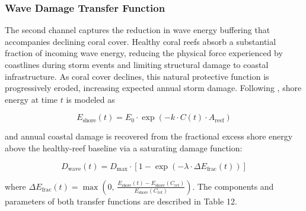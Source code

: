 \documentclass[10pt,letterpaper]{article}
\begin{document}
\subsubsection{Wave Damage Transfer Function}

The second channel captures the reduction in wave energy buffering that accompanies declining coral cover. Healthy coral reefs absorb a substantial fraction of incoming wave energy, reducing the physical force experienced by coastlines during storm events and limiting structural damage to coastal infrastructure. As coral cover declines, this natural protective function is progressively eroded, increasing expected annual storm damage. Following \cite{ferrario_2014, storlazzi_2019}, shore energy at time $t$ is modeled as

\begin{equation}
E_{\text{shore}}(t) = E_0 \cdot \exp\!\left(-k \cdot C(t) \cdot A_{\text{reef}}\right)
\end{equation}

\noindent and annual coastal damage is recovered from the fractional excess shore energy above the healthy-reef baseline via a saturating damage function:

\begin{equation}
D_{\text{wave}}(t) = D_{\max} \cdot \left[1 - \exp\!\left(-\lambda \cdot \Delta E_{\text{frac}}(t)\right)\right]
\end{equation}

\noindent where $\Delta E_{\text{frac}}(t) = \max\!\left(0,\, \frac{E_{\text{shore}}(t) - E_{\text{shore}}(C_{\text{ref}})}{E_{\text{shore}}(C_{\text{ref}})}\right)$. The components and parameters of both transfer functions are described in Table 12.
\end{document}
